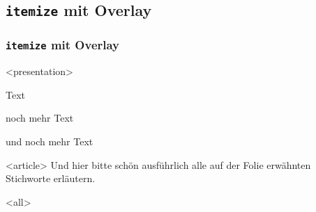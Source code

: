 \subsection{\texttt{itemize} mit Overlay}

\begin{frame}[fragile]
\frametitle<presentation>{\texttt{itemize} mit Overlay}


\mode
<presentation>
\begin{oitemize}
 \item Text
 \item noch mehr Text
 \item und noch mehr Text
\end{oitemize}


\mode
<article>
Und hier bitte schön ausführlich alle auf der Folie erwähnten Stichworte erläutern.



\mode
<all>

\end{frame}
\newpage
\clearpage